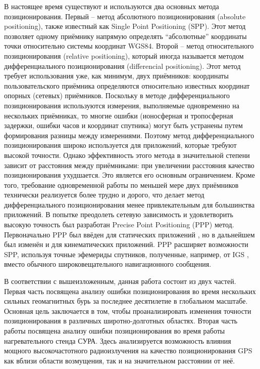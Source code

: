 В настоящее время существуют и используются два основных метода позиционирования.
Первый -- метод абсолютного позиционирования (absolute positioning), также известный как Single Point Positioning (SPP).
Этот метод позволяет одному приёмнику напрямую определять ``абсолютные'' координаты точки относительно системы координат WGS84.
Второй -- метод относительного позиционирования (relative positioning), который иногда называется методом дифференциального позиционирования (differencial positioning). 
Этот метод требует использования уже, как минимум, двух приёмников: координаты пользовательского приёмника определяются относительно известных координат опорных (сетевых) приёмников. 
Поскольку в методе дифференциального позиционирования используются измерения, выполняемые одновременно на нескольких приёмниках, то многие ошибки (ионосферная и тропосферная задержки, ошибки часов и координат спутника) могут быть устранены путем формирования разницы между измерениями. 
Поэтому метод дифференциального позиционирования широко используется для приложений, которые требуют высокой точности.
Однако эффективность этого метода в значительной степени зависит от расстояния между приёмниками: при увеличении расстояния качество позиционирования ухудшается.
Это является его основным ограничением. 
Кроме того, требование одновременной работы по меньшей мере двух приёмников технически реализуется более трудно и дорого, что делает метод дифференциального позиционирования менее привлекательным для большинства приложений.
В попытке преодолеть сетевую зависимость и удовлетворить высокую точность был разработан Precise Point Positioning (PPP) метод.
Первоначально PPP был ввёден для статических приложений \cite{Zumberge1997}, но в дальнейшем был изменён и для кинематических приложений.
PPP расширяет возможности SPP, используя точные эфемериды спутников, полученные, например, от IGS \cite{Dow2009}, вместо обычного широковещательного навигационного сообщения.

В соответствии с вышеизложенным, данная работа состоит из двух частей.
Первая часть посвящена анализу ошибки позиционирования во время нескольких сильных геомагнитных бурь за последнее десятилетие в глобальном масштабе.
Основная цель заключается в том, чтобы проанализировать изменения точности позиционирования в различных широтно-долготных областях.
Вторая часть работы посвящена анализу ошибки позиционирования во время работы нагревательного стенда СУРА.
Здесь анализируется возможность влияния мощного высокочастотного радиоизлучения на качество позиционирования GPS как вблизи области возмущения, так и на значительном расстоянии от неё.